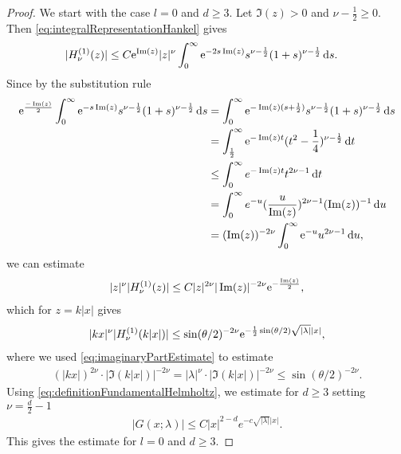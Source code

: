 \begin{proof}
  We start with the case $l = 0$ and $d \geq 3$.
  Let $\Im(z) > 0$ and $\nu - \frac{1}{2} \geq 0$.
  Then \eqref{eq:integralRepresentationHankel} gives
  \begin{align*}
    |H_\nu^{(1)}(z)|
    &\leq C \mathrm{e}^{\operatorname{Im}(z)} |z|^\nu \int_0^\infty \mathrm{e}^{-2s \operatorname{Im}(z)} s^{\nu - \frac{1}{2}} (1 + s)^{\nu - \frac{1}{2}} \, {\operatorname{d}\!{s}}.
  \end{align*}
  Since by the substitution rule
  \begin{align*}
    \mathrm{e}^{\frac{-\operatorname{Im}(z)}{2}} \int_0^\infty \mathrm{e}^{-s \operatorname{Im}(z)} s^{\nu - \frac{1}{2}} ( 1 + s )^{\nu - \frac{1}{2}} \, {\operatorname{d}\!{s}}
    &= \int_0^\infty \mathrm{e}^{-\operatorname{Im}(z) ( s + \frac{1}{2})} s^{\nu - \frac{1}{2}} ( 1 + s )^{\nu - \frac{1}{2}} \, {\operatorname{d}\!{s}} \\
    &= \int_{\frac{1}{2}}^\infty \mathrm{e}^{-\operatorname{Im}(z) t } (t^2 - \frac{1}{4} ) ^{\nu - \frac{1}{2}} \, {\operatorname{d}\!{t}} \\
    &\leq \int_0^\infty e^{-\operatorname{Im}(z) t} t^{2\nu - 1} \, {\operatorname{d}\!{t}} \\
    &= \int_0^\infty e^{-u} (\frac{ u}{\operatorname{Im}(z)} )^{2 \nu - 1} (\operatorname{Im}(z))^{-1} \, {\operatorname{d}\!{u}} \\
    &= (\operatorname{Im}(z))^{-2 \nu} \int_0^\infty \mathrm{e}^{-u} u^{2 \nu - 1} \, {\operatorname{d}\!{u}},
  \end{align*}
  we can estimate
  \begin{align*}
    |z|^\nu |H_\nu^{(1)}(z)| \leq C |z|^{2 \nu} |\operatorname{Im}(z)|^{-2\nu} \mathrm{e}^{-\frac{\operatorname{Im}(z)}{2}},
  \end{align*}
  which for $z = k|x|$ gives
  \begin{align}
    \label{eq:zHEstimate}
    |kx|^\nu |H_\nu^{(1)}(k |x|)| \leq \sin(\theta/2)^{-2\nu} \mathrm{e}^{-\frac{1}{2} \sin(\theta/2) \sqrt{|\lambda|} |x|},
  \end{align}
  where we used \eqref{eq:imaginaryPartEstimate} to estimate
  \begin{align*}
    (|kx|)^{2\nu} \cdot |\Im(k|x|)|^{-2\nu} 
    = |\lambda|^\nu \cdot |\Im(k|x|)|^{-2\nu} 
    \leq \sin(\theta/2)^{-2\nu}.
  \end{align*}
  Using \eqref{eq:definitionFundamentalHelmholtz}, we estimate for $d \geq 3$ setting $\nu = \frac{d}{2} - 1$
  \begin{align*}
    |G(x; \lambda)| 
    \leq C  |x|^{2 - d} e^{-c \sqrt{|\lambda|} |x|}.
  \end{align*}
  This gives the estimate for $l = 0$ and $d \geq 3$.


\end{proof}
